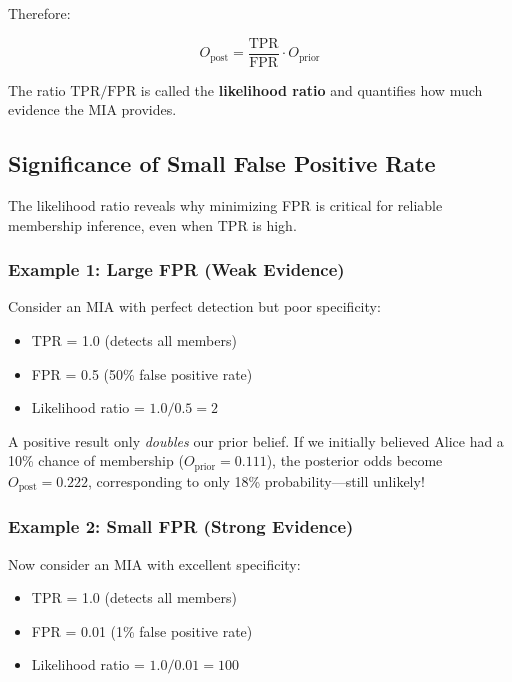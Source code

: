 \documentclass[11pt,letterpaper]{article}
\begin{document}
Therefore:

\begin{equation}
    \boxed{O_{\text{post}} = \frac{\text{TPR}}{\text{FPR}} \cdot O_{\text{prior}}}
\end{equation}

The ratio $\text{TPR}/\text{FPR}$ is called the \textbf{likelihood ratio} and quantifies how much evidence the MIA provides.

\subsection{Significance of Small False Positive Rate}

The likelihood ratio reveals why minimizing FPR is critical for reliable membership inference, even when TPR is high.

\subsubsection{Example 1: Large FPR (Weak Evidence)}

Consider an MIA with perfect detection but poor specificity:
\begin{itemize}[leftmargin=*]
    \item TPR = 1.0 (detects all members)
    \item FPR = 0.5 (50\% false positive rate)
    \item Likelihood ratio = $1.0 / 0.5 = 2$
\end{itemize}

A positive result only \textit{doubles} our prior belief. If we initially believed Alice had a 10\% chance of membership ($O_{\text{prior}} = 0.111$), the posterior odds become $O_{\text{post}} = 0.222$, corresponding to only 18\% probability---still unlikely!

\subsubsection{Example 2: Small FPR (Strong Evidence)}

Now consider an MIA with excellent specificity:
\begin{itemize}[leftmargin=*]
    \item TPR = 1.0 (detects all members)
    \item FPR = 0.01 (1\% false positive rate)
    \item Likelihood ratio = $1.0 / 0.01 = 100$
\end{itemize}
\end{document}
